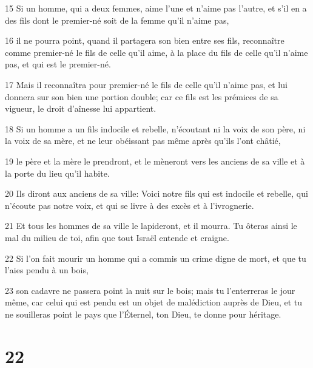 \par 15 Si un homme, qui a deux femmes, aime l'une et n'aime pas l'autre, et s'il en a des fils dont le premier-né soit de la femme qu'il n'aime pas,
\par 16 il ne pourra point, quand il partagera son bien entre ses fils, reconnaître comme premier-né le fils de celle qu'il aime, à la place du fils de celle qu'il n'aime pas, et qui est le premier-né.
\par 17 Mais il reconnaîtra pour premier-né le fils de celle qu'il n'aime pas, et lui donnera sur son bien une portion double; car ce fils est les prémices de sa vigueur, le droit d'aînesse lui appartient.
\par 18 Si un homme a un fils indocile et rebelle, n'écoutant ni la voix de son père, ni la voix de sa mère, et ne leur obéissant pas même après qu'ils l'ont châtié,
\par 19 le père et la mère le prendront, et le mèneront vers les anciens de sa ville et à la porte du lieu qu'il habite.
\par 20 Ils diront aux anciens de sa ville: Voici notre fils qui est indocile et rebelle, qui n'écoute pas notre voix, et qui se livre à des excès et à l'ivrognerie.
\par 21 Et tous les hommes de sa ville le lapideront, et il mourra. Tu ôteras ainsi le mal du milieu de toi, afin que tout Israël entende et craigne.
\par 22 Si l'on fait mourir un homme qui a commis un crime digne de mort, et que tu l'aies pendu à un bois,
\par 23 son cadavre ne passera point la nuit sur le bois; mais tu l'enterreras le jour même, car celui qui est pendu est un objet de malédiction auprès de Dieu, et tu ne souilleras point le pays que l'Éternel, ton Dieu, te donne pour héritage.

\chapter{22}

